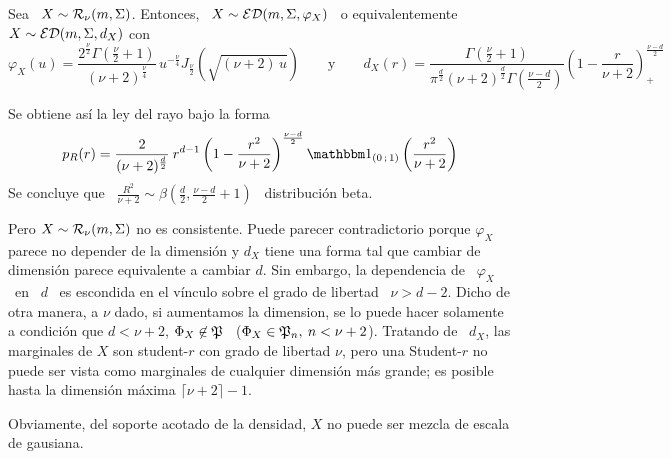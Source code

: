 \begin{ejemplo}
%
  Sea \ $X \sim \mathcal{R}_\nu(m,\Sigma)$.  Entonces, \ $X \sim \mathcal{ED}(m,\Sigma,\varphi_X)$
  \ o equivalentemente \ $X \sim \mathcal{ED}(m,\Sigma,d_X)$ con
  \[
  \varphi_X(u)   =   \frac{2^{\frac{\nu}{2}}   \Gamma\left(   \frac{\nu}{2}   +1
    \right)}{(\nu+2)^{\frac{\nu}{4}}}            \,           u^{-\frac{\nu}{4}}
  J_{\frac{\nu}{2}}\left(  \sqrt{(\nu+2) \,  u} \right)  \qquad  \mbox{y} \qquad
  d_X(r)  =  \frac{\Gamma\left(  \frac{\nu}{2}  +  1  \right)}{\pi^{\frac{d}{2}}
    (\nu+2)^{\frac{d}{2}}  \Gamma\left(  \frac{\nu-d}{2}  \right)}  \left(  1  -
    \frac{r}{\nu+2} \right)_+^{\frac{\nu-d}{2}}
  \]
  
  Se obtiene as\'i la ley del rayo bajo la forma
  \[
  p_R(r) = \frac{2}{(\nu+2)^{\frac{d}{2}}} \:  r^{d-1} \left( 1 - \frac{r^2}{\nu+2}
  \right)^{\frac{\nu-d}{2}} \un_{(0 \; 1)}\left( \frac{r^2}{\nu+2} \right)
  \]
  Se  concluye   que  \   $\frac{R^2}{\nu+2}  \sim  \beta\left(   \frac{d}{2}  ,
    \frac{\nu-d}{2}+1 \right)$ \ distribuci\'on beta.

  Pero $X \sim \mathcal{R}_\nu(m,\Sigma)$ no es consistente. Puede parecer contradictorio
  porque  $\varphi_X$ parece no  depender de  la dimensi\'on  y $d_X$  tiene una
  forma tal  que cambiar  de dimensi\'on parece  equivalente a cambiar  $d$. Sin
  embargo, la  dependencia de  \ $\varphi_X$  \ en \  $d$ \  es escondida  en el
  v\'inculo sobre el  grado de libertad \  $\nu > d-2$. Dicho de  otra manera, a
  $\nu$  dado,  si  aumentamos la  dimension,  se  lo  puede hacer  solamente  a
  condici\'on que $d < \nu+2$, \ie $\Phi_X \not\in \mathfrak{P}$ \ ($\Phi_X \in \mathfrak{P}_n, \:
  n < \nu+2$).   Tratando de \ $d_X$, las marginales de  $X$ son student-$r$ con
  grado  de  libertad  $\nu$, pero  una  Student-$r$  no  puede ser  vista  como
  marginales  de  cualquier  dimensi\'on  m\'as  grande;  es  posible  hasta  la
  dimensi\'on m\'axima $\lceil \nu+2 \rceil-1$.

  Obviamente, del  soporte acotado de  la densidad, $X$  no puede ser  mezcla de
  escala de gausiana. 
\end{ejemplo}

